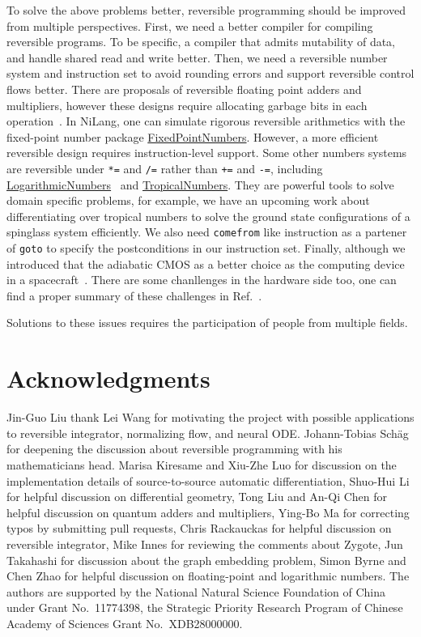 \documentclass{article}
\newcommand{\<}{\langle}
\renewcommand{\>}{\rangle}
\newcommand{\Ref}[1]{Ref.~\cite{#1}}
\theoremstyle{definition}\newtheorem{definition}{\textit{Definition}}
\begin{document}
To solve the above problems better, reversible programming should be improved from multiple perspectives.
First, we need a better compiler for compiling reversible programs.
To be specific, a compiler that admits mutability of data, and handle shared read and write better.
Then, we need a reversible number system and instruction set to avoid rounding errors and support reversible control flows better.
There are proposals of reversible floating point adders and multipliers, however these designs require allocating garbage bits in each operation~\cite{Nachtigal2010,Nachtigal2011,Nguyen2013,Hner2018}.
In NiLang, one can simulate rigorous reversible arithmetics with the fixed-point number package \href{https://github.com/JuliaMath/FixedPointNumbers.jl}{FixedPointNumbers}.
However, a more efficient reversible design requires instruction-level support.
Some other numbers systems are reversible under \texttt{*=} and \texttt{/=} rather than \texttt{+=} and \texttt{-=}, including \href{https://github.com/cjdoris/LogarithmicNumbers.jl}{LogarithmicNumbers}~\cite{Taylor1988} and \href{https://github.com/GiggleLiu/TropicalNumbers.jl}{TropicalNumbers}.
They are powerful tools to solve domain specific problems, for example, we have an upcoming work about differentiating over tropical numbers to solve the ground state configurations of a spinglass system efficiently.
We also need \texttt{comefrom} like instruction as a partener of \texttt{goto} to specify the postconditions in our instruction set.
Finally, although we introduced that the adiabatic CMOS as a better choice as the computing device in a spacecraft~\cite{Debenedictis2017}.
There are some chanllenges in the hardware side too, one can find a proper summary of these challenges in \Ref{Frank2005b}.

Solutions to these issues requires the participation of people from multiple fields.

\section{Acknowledgments}
Jin-Guo Liu thank Lei Wang for motivating the project with possible applications to reversible integrator, normalizing flow, and neural ODE.
Johann-Tobias Schäg for deepening the discussion about reversible programming with his mathematicians head.
Marisa Kiresame and Xiu-Zhe Luo for discussion on the implementation details of source-to-source automatic differentiation,
Shuo-Hui Li for helpful discussion on differential geometry, Tong Liu and An-Qi Chen for helpful discussion on quantum adders and multipliers, Ying-Bo Ma for correcting typos by submitting pull requests, Chris Rackauckas for helpful discussion on reversible integrator, Mike Innes for reviewing the comments about Zygote, Jun Takahashi for discussion about the graph embedding problem, Simon Byrne and Chen Zhao for helpful discussion on floating-point and logarithmic numbers.
The authors are supported by the National Natural Science Foundation of China under Grant No.~11774398, the Strategic Priority Research Program of Chinese Academy of Sciences Grant No.~XDB28000000.
\end{document}
